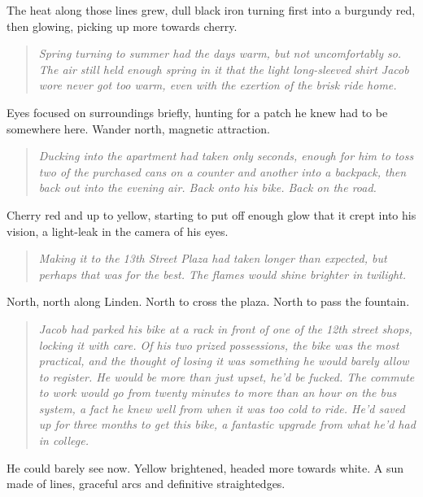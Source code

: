 \begin{paracol}{2}
\begin{rightcolumn}
    The heat along those lines grew, dull black iron turning first into a burgundy red, then glowing, picking up more towards cherry.

    \begin{quote}
    \emph{Spring turning to summer had the days warm, but not uncomfortably so. The air still held enough spring in it that the light long-sleeved shirt Jacob wore never got too warm, even with the exertion of the brisk ride home.}
    \end{quote}

    Eyes focused on surroundings briefly, hunting for a patch he knew had to be somewhere here. Wander north, magnetic attraction.

    \begin{quote}
    \emph{Ducking into the apartment had taken only seconds, enough for him to toss two of the purchased cans on a counter and another into a backpack, then back out into the evening air. Back onto his bike. Back on the road.}
    \end{quote}

    Cherry red and up to yellow, starting to put off enough glow that it crept into his vision, a light-leak in the camera of his eyes.

    \begin{quote}
    \emph{Making it to the 13th Street Plaza had taken longer than expected, but perhaps that was for the best. The flames would shine brighter in twilight.}
    \end{quote}

    North, north along Linden. North to cross the plaza. North to pass the fountain.

    \begin{quote}
    \emph{Jacob had parked his bike at a rack in front of one of the 12th street shops, locking it with care. Of his two prized possessions, the bike was the most practical, and the thought of losing it was something he would barely allow to register. He would be more than just upset, he'd be fucked. The commute to work would go from twenty minutes to more than an hour on the bus system, a fact he knew well from when it was too cold to ride. He'd saved up for three months to get this bike, a fantastic upgrade from what he'd had in college.}
    \end{quote}

    He could barely see now. Yellow brightened, headed more towards white. A sun made of lines, graceful arcs and definitive straightedges.


\end{rightcolumn}
\end{paracol}
